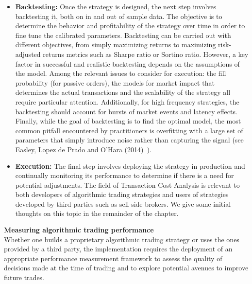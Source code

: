 \begin{itemize}
\item \textbf{Backtesting:} Once the strategy is designed, the next step involves backtesting it, both on in and out of sample data. The objective is to determine the behavior and profitability of the strategy over time in order to fine tune the calibrated parameters. Backtesting can be carried out with different objectives, from simply maximizing returns to maximizing risk-adjusted returns metrics such as Sharpe ratio or Sortino ratio. However, a key factor in successful and realistic backtesting depends on the assumptions of the model. Among the relevant issues to consider for execution: the fill probability (for passive orders), the models for market impact that determines the actual transactions and the scalability of the strategy all require particular attention. Additionally, for high frequency strategies, the backtesting should account for bursts of market events and latency effects. Finally, while the goal of backtesting is to find the optimal model, the most common pitfall encountered by practitioners is overfitting with a large set of parameters that simply introduce noise rather than capturing the signal (see Easley, Lopez de Prado and O'Hara (2014)~\cite{easley}).  

\item \textbf{Execution:} The final step involves deploying the strategy in production and continually monitoring its performance to determine if there is a need for potential adjustments. The field of Transaction Cost Analysis is relevant to both developers of algorithmic trading strategies and users of strategies developed by third parties such as sell-side brokers. We give some initial thoughts on this topic in the remainder of the chapter.
\end{itemize}

\noindent\textbf{Measuring algorithmic trading performance} \\

Whether one builds a proprietary algorithmic trading strategy or uses the ones provided by a third party, the implementation requires the deployment of an appropriate performance measurement framework to assess the quality of decisions made at the time of trading and to explore potential avenues to improve future trades.

